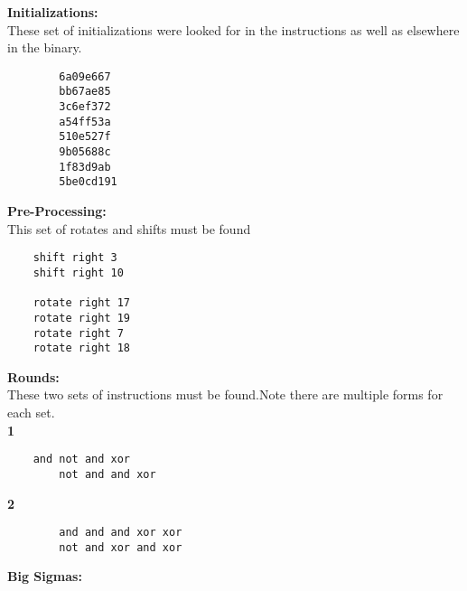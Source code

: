 \documentclass{article}
\begin{document}
    \textbf{Initializations:}\\

    These set of initializations were looked for in the instructions as well
    as elsewhere in the binary.\\

\begin{algorithm}
\lstset{language=[mips]Assembler}
\begin{lstlisting}
        6a09e667
        bb67ae85
        3c6ef372
        a54ff53a
        510e527f
        9b05688c
        1f83d9ab
        5be0cd191
\end{lstlisting}
\end{algorithm}

    \textbf{Pre-Processing:} \\

    This set of rotates and shifts must be found \\

\begin{algorithm}
\lstset{language=[mips]Assembler}
\begin{lstlisting}
    shift right 3
    shift right 10

    rotate right 17
    rotate right 19
    rotate right 7
    rotate right 18
\end{lstlisting}
\end{algorithm}

    \textbf{Rounds:} \\

    These two sets of instructions must be found.Note there are multiple forms
    for each set. \\

    \textbf{1}\\

\begin{algorithm}
\lstset{language=[mips]Assembler}
\begin{lstlisting}        
	and not and xor
        not and and xor
\end{lstlisting}
\end{algorithm}

    \textbf{2}\\

\begin{algorithm}
\lstset{language=[mips]Assembler}
\begin{lstlisting}
        and and and xor xor
        not and xor and xor
\end{lstlisting}
\end{algorithm}
\pagebreak
    \textbf{Big Sigmas:} \\
\end{document}
